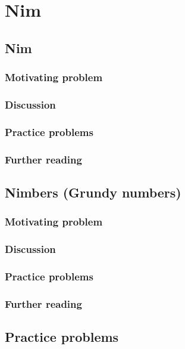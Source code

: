 \section{Nim}

\subsection{Nim}

\subsubsection*{Motivating problem}







\subsubsection*{Discussion}

\subsubsection*{Practice problems}

\subsubsection*{Further reading}

\subsection{Nimbers (Grundy numbers)}

\subsubsection*{Motivating problem}







\subsubsection*{Discussion}

\subsubsection*{Practice problems}

\subsubsection*{Further reading}

\subsection{Practice problems}
